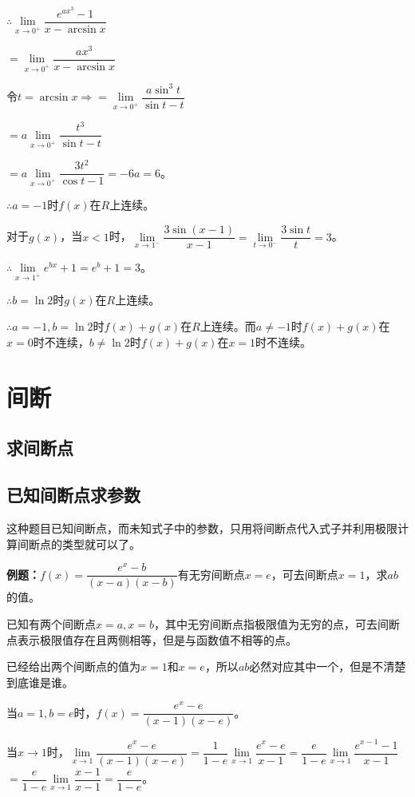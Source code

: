 \documentclass[UTF8, 12pt]{ctexart}
\begin{document}
$\therefore\lim\limits_{x\to 0^+}\dfrac{e^{ax^3}-1}{x-\arcsin x}$\medskip

$=\lim\limits_{x\to 0^+}\dfrac{ax^3}{x-\arcsin x}$\medskip

$\text{令}t=\arcsin x\Rightarrow=\lim\limits_{x\to 0^+}\dfrac{a\sin^3t}{\sin t-t}$

$=a\lim\limits_{x\to 0^+}\dfrac{t^3}{\sin t-t}$\medskip

$=a\lim\limits_{x\to 0^+}\dfrac{3t^2}{\cos t-1}=-6a=6$。\medskip

$\therefore a=-1$时$f(x)$在$R$上连续。\medskip

对于$g(x)$，当$x<1$时，$\lim\limits_{x\to 1^-}\dfrac{3\sin(x-1)}{x-1}=\lim\limits_{t\to 0^-}\dfrac{3\sin t}{t}=3$。\medskip

$\therefore\lim\limits_{x\to 1^+}e^{bx}+1=e^b+1=3$。\medskip

$\therefore b=\ln 2$时$g(x)$在$R$上连续。\medskip

$\therefore a=-1,b=\ln 2$时$f(x)+g(x)$在$R$上连续。而$a\neq -1$时$f(x)+g(x)$在$x=0$时不连续，$b\neq\ln 2$时$f(x)+g(x)$在$x=1$时不连续。

\section{间断}

\subsection{求间断点}

\subsection{已知间断点求参数}

这种题目已知间断点，而未知式子中的参数，只用将间断点代入式子并利用极限计算间断点的类型就可以了。

\textbf{例题：}$f(x)=\dfrac{e^x-b}{(x-a)(x-b)}$有无穷间断点$x=e$，可去间断点$x=1$，求$ab$的值。

已知有两个间断点$x=a,x=b$，其中无穷间断点指极限值为无穷的点，可去间断点表示极限值存在且两侧相等，但是与函数值不相等的点。

已经给出两个间断点的值为$x=1$和$x=e$，所以$ab$必然对应其中一个，但是不清楚到底谁是谁。

当$a=1,b=e$时，$f(x)=\dfrac{e^x-e}{(x-1)(x-e)}$。\medskip

当$x\to 1$时，$\lim\limits_{x\to 1}\dfrac{e^x-e}{(x-1)(x-e)}$$=\dfrac{1}{1-e}\lim\limits_{x\to 1}\dfrac{e^x-e}{x-1}$$=\dfrac{e}{1-e}\lim\limits_{x\to 1}\dfrac{e^{x-1}-1}{x-1}$$=\dfrac{e}{1-e}\lim\limits_{x\to 1}\dfrac{x-1}{x-1}$$=\dfrac{e}{1-e}$。\medskip
\end{document}
